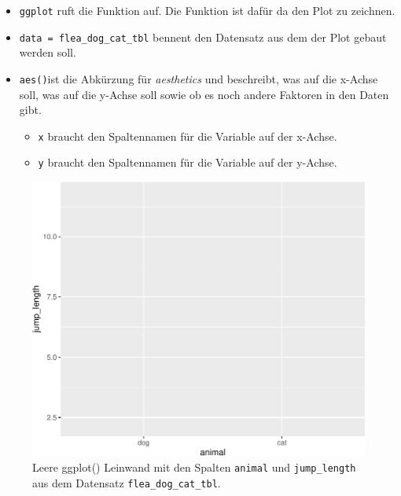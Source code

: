 \documentclass[
  letterpaper,
]{scrbook}
\providecommand{\tightlist}{%
  \setlength{\itemsep}{0pt}\setlength{\parskip}{0pt}}\usepackage{longtable,booktabs,array}
\begin{document}
\begin{itemize}
\tightlist
\item
  \texttt{ggplot} ruft die Funktion auf. Die Funktion ist dafür da den
  Plot zu zeichnen.
\item
  \texttt{data\ =\ flea\_dog\_cat\_tbl} bennent den Datensatz aus dem
  der Plot gebaut werden soll.
\item
  \texttt{aes()}ist die Abkürzung für \emph{aesthetics} und beschreibt,
  was auf die x-Achse soll, was auf die y-Achse soll sowie ob es noch
  andere Faktoren in den Daten gibt.

  \begin{itemize}
  \tightlist
  \item
    \texttt{x} braucht den Spaltennamen für die Variable auf der
    x-Achse.
  \item
    \texttt{y} braucht den Spaltennamen für die Variable auf der
    y-Achse.
  \end{itemize}
\end{itemize}

{}

\begin{figure}

{\centering \includegraphics{./eda-ggplot_files/figure-pdf/fig-ggplot-1-1.pdf}

}

\caption{\label{fig-ggplot-1}Leere ggplot() Leinwand mit den Spalten
\texttt{animal} und \texttt{jump\_length} aus dem Datensatz
\texttt{flea\_dog\_cat\_tbl}.}

\end{figure}
\end{document}
